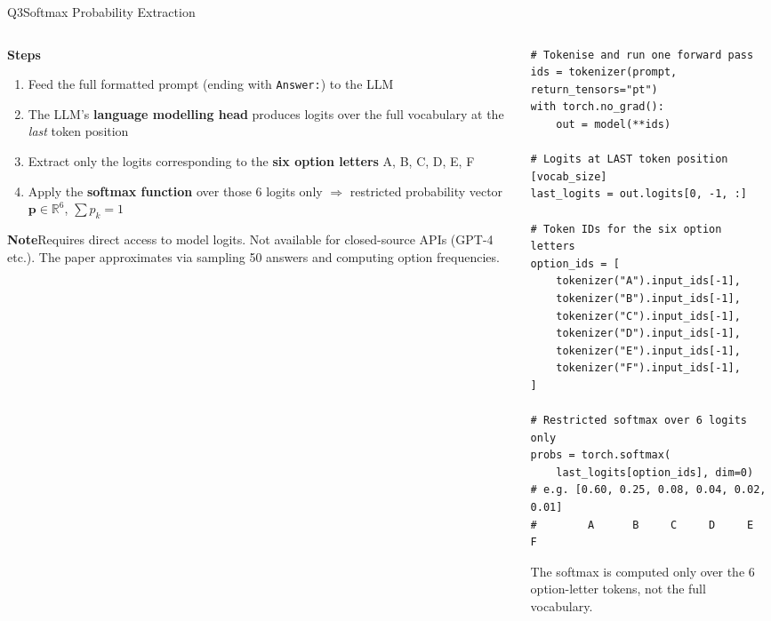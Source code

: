 \documentclass[aspectratio=169,10pt]{beamer}
\newcommand{\hruleslide}{%
  \vspace{0.15em}{\color{Rule}\hrule height 0.4pt}\vspace{0.3em}}
\newcommand{\notebox}[2]{%
  \begin{tcolorbox}[colback=#1!5,colframe=#1!80,boxrule=0.5pt,arc=2pt,left=2pt,right=2pt,top=2pt,bottom=2pt]
    \footnotesize\textcolor{#1!80!black}{\bfseries Note}\enspace #2
  \end{tcolorbox}}
\begin{document}
\begin{frame}[fragile]{Q3\enspace Softmax Probability Extraction}

\begin{columns}[T]
  \begin{column}{0.40\textwidth}
    \vspace{0.2em}
    {\small\bfseries\color{darkred}Steps }
    \hruleslide
    \begin{enumerate}\setlength\itemsep{5pt}\footnotesize
      \item Feed the full formatted prompt (ending with \texttt{Answer:}) to the LLM
      \item The LLM's \textbf{language modelling head} produces logits over the full vocabulary at the \emph{last} token position
      \item Extract only the logits corresponding to the \textbf{six option letters} A, B, C, D, E, F
      \item Apply the \textbf{softmax function} over those 6 logits only $\Rightarrow$ restricted probability vector $\mathbf{p}\in\mathbb{R}^6$, $\sum p_k=1$
    \end{enumerate}

    \vspace{0.7em}
    \notebox{Coral}{Requires direct access to model logits. Not available for closed-source APIs (GPT-4 etc.). The paper approximates via sampling 50 answers and computing option frequencies.}
  \end{column}

  \begin{column}{0.57\textwidth}
    \begin{lstlisting}
# Tokenise and run one forward pass
ids = tokenizer(prompt, return_tensors="pt")
with torch.no_grad():
    out = model(**ids)

# Logits at LAST token position [vocab_size]
last_logits = out.logits[0, -1, :]

# Token IDs for the six option letters
option_ids = [
    tokenizer("A").input_ids[-1],
    tokenizer("B").input_ids[-1],
    tokenizer("C").input_ids[-1],
    tokenizer("D").input_ids[-1],
    tokenizer("E").input_ids[-1],
    tokenizer("F").input_ids[-1],
]

# Restricted softmax over 6 logits only
probs = torch.softmax(
    last_logits[option_ids], dim=0)
# e.g. [0.60, 0.25, 0.08, 0.04, 0.02, 0.01]
#        A      B     C     D     E     F
    \end{lstlisting}
    \vspace{0.2em}
    {\fontsize{7}{9}\selectfont\color{Slate}
      The softmax is computed only over the 6 option-letter tokens, not the full vocabulary.}
  \end{column}
\end{columns}
\end{frame}
\end{document}
